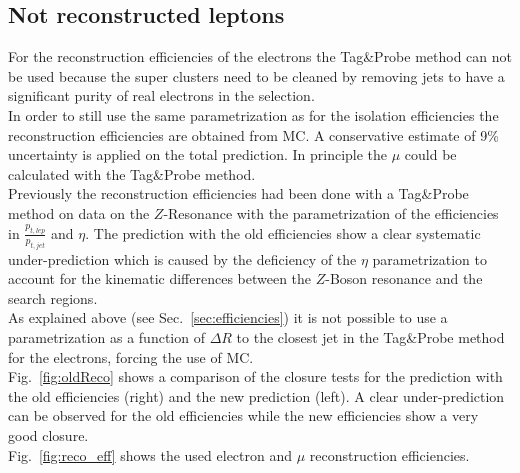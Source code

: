 
%



\subsection{Not reconstructed leptons}
\label{sec:reconstruc}
For the reconstruction efficiencies of the electrons the Tag\&Probe method can not be used because the super clusters need to be cleaned by removing jets to have a significant purity of real electrons in the selection\cite{bib:phd:jan}.\\
In order to still use the same parametrization as for the isolation efficiencies the reconstruction efficiencies are obtained from MC. A conservative estimate of 9\% uncertainty is applied on the total prediction. In principle the $\mu$ could be calculated with the Tag\&Probe method.\\
Previously\cite{bib:phd:jan} the reconstruction efficiencies had been done with a Tag\&Probe method on data on the $Z$-Resonance with the parametrization of the efficiencies in $\frac{p_{t,lep}}{p_{t,jet}}$ and $\eta$. The prediction with the old efficiencies show a clear systematic under-prediction which is caused by the deficiency of the $\eta$ parametrization to account for the kinematic differences between the $Z$-Boson resonance and the search regions. \\ 
As explained above (see Sec.~\ref{sec:efficiencies}) it is not possible to use a parametrization as a function of $\Delta R$ to the closest jet in the Tag\&Probe method for the electrons, forcing the use of MC.\\
Fig.~\ref{fig:oldReco} shows a comparison of the closure tests for the prediction with the old efficiencies (right) and the new  prediction (left). A clear under-prediction can be observed for the old efficiencies while the new efficiencies show a very good closure.\\
Fig.~\ref{fig:reco_eff} shows the used electron and $\mu$ reconstruction efficiencies.

